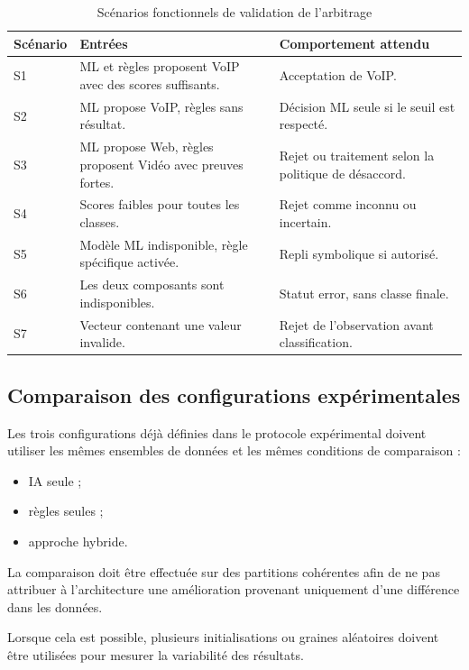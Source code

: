 \begin{table}[H]
\centering
\caption{Scénarios fonctionnels de validation de l'arbitrage}
\label{tab:tests_arbitrage}
\small
\begin{tabularx}{\textwidth}{|l|X|X|}
\hline
\textbf{Scénario} & \textbf{Entrées} & \textbf{Comportement attendu} \\
\hline
S1 &
ML et règles proposent VoIP avec des scores suffisants. &
Acceptation de VoIP. \\
\hline
S2 &
ML propose VoIP, règles sans résultat. &
Décision ML seule si le seuil est respecté. \\
\hline
S3 &
ML propose Web, règles proposent Vidéo avec preuves fortes. &
Rejet ou traitement selon la politique de désaccord. \\
\hline
S4 &
Scores faibles pour toutes les classes. &
Rejet comme inconnu ou incertain. \\
\hline
S5 &
Modèle ML indisponible, règle spécifique activée. &
Repli symbolique si autorisé. \\
\hline
S6 &
Les deux composants sont indisponibles. &
Statut error, sans classe finale. \\
\hline
S7 &
Vecteur contenant une valeur invalide. &
Rejet de l'observation avant classification. \\
\hline
\end{tabularx}
\end{table}

\subsection{Comparaison des configurations expérimentales}

Les trois configurations déjà définies dans le protocole expérimental doivent utiliser les mêmes ensembles de données et les mêmes conditions de comparaison :

\begin{itemize}
    \item IA seule ;
    \item règles seules ;
    \item approche hybride.
\end{itemize}

La comparaison doit être effectuée sur des partitions cohérentes afin de ne pas attribuer à l'architecture une amélioration provenant uniquement d'une différence dans les données.

Lorsque cela est possible, plusieurs initialisations ou graines aléatoires doivent être utilisées pour mesurer la variabilité des résultats.

